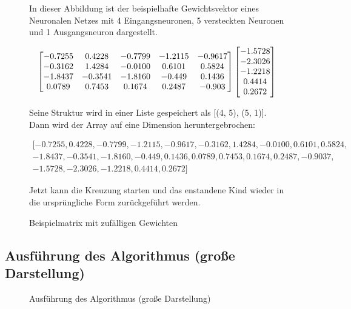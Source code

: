 \documentclass[parskip=half,titlepage]{scrartcl}
\begin{document}
\begin{figure}[h]
\begin{mdframed}[linecolor=black!50]
In dieser Abbildung ist der beispielhafte Gewichtsvektor eines Neuronalen Netzes mit 4 Eingangsneuronen, 5 versteckten Neuronen und 1 Ausgangsneuron dargestellt.
\begin{center}
\begin{displaymath}
\begin{bmatrix}
    -0.7255 & 0.4228 & -0.7799 & -1.2115 & -0.9617\\
    -0.3162 & 1.4284 & -0.0100 & 0.6101 & 0.5824\\
    -1.8437 & -0.3541 & -1.8160 & -0.449 & 0.1436\\
     0.0789 & 0.7453 & 0.1674 & 0.2487 & -0.903
\end{bmatrix}
\begin{bmatrix}
    -1.5728\\
    -2.3026\\
    -1.2218\\
     0.4414\\
     0.2672
\end{bmatrix}\newline
\end{displaymath}
\end{center}
Seine Struktur wird in einer Liste gespeichert als [(4, 5), (5, 1)]. Dann wird der Array auf eine Dimension heruntergebrochen:
\begin{center}
\begin{displaymath}
\begin{gathered}
[-0.7255, 0.4228, -0.7799, -1.2115, -0.9617, -0.3162, 1.4284, -0.0100, 0.6101, 0.5824,\\ 
-1.8437, -0.3541, -1.8160, -0.449, 0.1436, 0.0789, 0.7453, 0.1674, 0.2487, -0.9037,\\
-1.5728, -2.3026, -1.2218, 0.4414, 0.2672]
\end{gathered}
\end{displaymath}
\end{center}
Jetzt kann die Kreuzung starten und das enstandene Kind wieder in die ursprüngliche Form zurückgeführt werden.

 \caption{Beispielmatrix mit zufälligen Gewichten}
 \label{fig:matrix}
\end{mdframed}
\end{figure}

\subsection{Ausführung des Algorithmus (große Darstellung)}

\begin{figure}[h]
 
 \caption{Ausführung des Algorithmus (große Darstellung)}
\end{figure}
\end{document}
